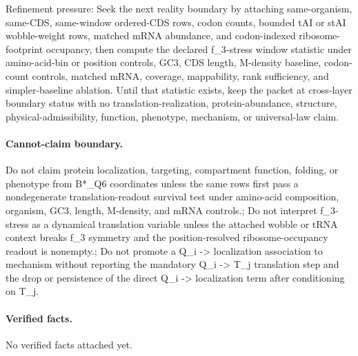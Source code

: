 Refinement pressure: Seek the next reality boundary by attaching same-organism, same-CDS, same-window ordered-CDS rows, codon counts, bounded tAI or stAI wobble-weight rows, matched mRNA abundance, and codon-indexed ribosome-footprint occupancy, then compute the declared f\_3-stress window statistic under amino-acid-bin or position controls, GC3, CDS length, M-density baseline, codon-count controls, matched mRNA, coverage, mappability, rank sufficiency, and simpler-baseline ablation. Until that statistic exists, keep the packet at cross-layer boundary status with no translation-realization, protein-abundance, structure, physical-admissibility, function, phenotype, mechanism, or universal-law claim.

\paragraph{Cannot-claim boundary.} Do not claim protein localization, targeting, compartment function, folding, or phenotype from B*\_Q6 coordinates unless the same rows first pass a nondegenerate translation-readout survival test under amino-acid composition, organism, GC3, length, M-density, and mRNA controls.; Do not interpret f\_3-stress as a dynamical translation variable unless the attached wobble or tRNA context breaks f\_3 symmetry and the position-resolved ribosome-occupancy readout is nonempty.; Do not promote a Q\_i -> localization association to mechanism without reporting the mandatory Q\_i -> T\_j translation step and the drop or persistence of the direct Q\_i -> localization term after conditioning on T\_j.

\paragraph{Verified facts.}
No verified facts attached yet.
